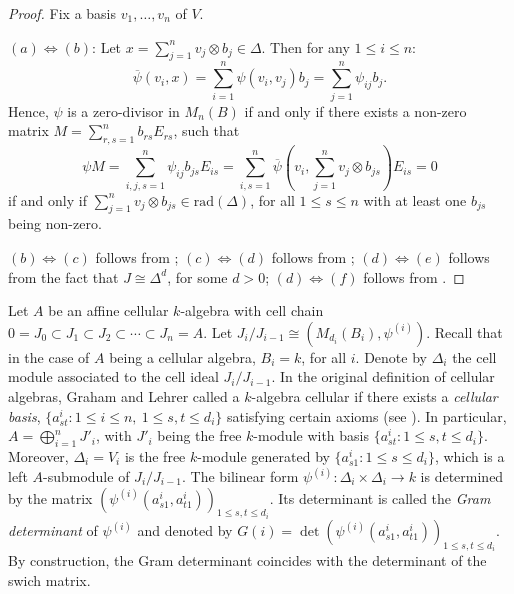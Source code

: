 \documentclass[oneside, a4paper, 11pt]{amsart}
\newcommand{\rad}{\mathrm{rad}}
\begin{document}
\begin{proof}
Fix a basis $v_1, \ldots, v_n$ of $V$.

$(a) \Leftrightarrow (b)$: 
Let $x=\sum_{j=1}^n v_j \otimes b_j \in \Delta$. Then for any $1\leq i\leq n$: 
\begin{equation}\label{eq:radical}
 \overline{\psi}(v_i, x) =  \sum_{i=1}^n \psi(v_i, v_j)b_j = \sum_{j=1}^n \psi_{ij}b_j.
\end{equation} 
Hence, $\psi$ is a zero-divisor in $M_n(B)$ if and only if there exists a non-zero matrix $M = \sum_{r,s=1}^n b_{rs} E_{rs}$, such that 
\begin{equation}
\psi M     
= \sum_{i,j,s=1}^n \psi_{ij}b_{js} E_{is}
= \sum_{i,s=1}^n \overline{\psi}\left(v_i, \sum_{j=1}^n v_j\otimes b_{js} \right) E_{is}=0 
\end{equation}
if and only if $\sum_{j=1}^n v_j\otimes b_{js} \in \rad(\Delta)$, for all $1\leq s \leq n$ with at least one $b_{js}$ being non-zero.

$(b)\Leftrightarrow (c)$ follows from \cite[Theorem 9.1]{Brown}; $(c)\Leftrightarrow (d)$ follows from \cite[Lemma 3.2]{CKLS}; 
$(d)\Leftrightarrow (e)$ follows from the fact that $J\cong \Delta^d$, for some $d>0$;
$(d)\Leftrightarrow (f)$ follows from \cite[Proposition 3.14]{CKLS}.
\end{proof}

Let $A$ be an affine cellular $k$-algebra with cell chain
$0 = J_0 \subset J_1 \subset J_2 \subset \cdots \subset J_n = A$. 
Let $J_i/J_{i-1}\cong (M_{d_i}(B_i),\psi^{(i)})$. Recall that in the case of $A$ being a cellular algebra,  $B_i=k$, for all $i$. Denote by $\Delta_i$ the cell module associated to the cell ideal $J_i/J_{i-1}$. In the original definition of cellular algebras, Graham and Lehrer called a $k$-algebra cellular if there exists a \emph{cellular basis}, $\{ a_{st}^i : 1\leq i\leq n, \: 1\leq s,t\leq d_i\}$ satisfying certain axioms (see \cite{GrahamLehrer}). In particular,  $A=\bigoplus_{i=1}^n J'_i$, with $J'_i$ being the free $k$-module with basis $\{a_{st}^i : 1\leq s,t \leq d_i\}$. Moreover, $\Delta_i=V_i$ is the free $k$-module generated by $\{ a_{s1}^i : 1\leq s \leq d_i\}$, which is a left $A$-submodule of $J_i/J_{i-1}$. The bilinear form $\psi^{(i)}:\Delta_i \times \Delta_i \to k$ is determined by the matrix $\left( \psi^{(i)}(a_{s1}^i, a_{t1}^i) \right)_{1\leq s,t\leq d_i}$. Its determinant is called the \emph{Gram determinant} of $\psi^{(i)}$ and denoted by $G(i) = \det\left( \psi^{(i)}(a_{s1}^i, a_{t1}^i) \right)_{1\leq s,t\leq d_i}$. By construction, the Gram determinant coincides with the determinant
of the swich matrix. 
\end{document}
